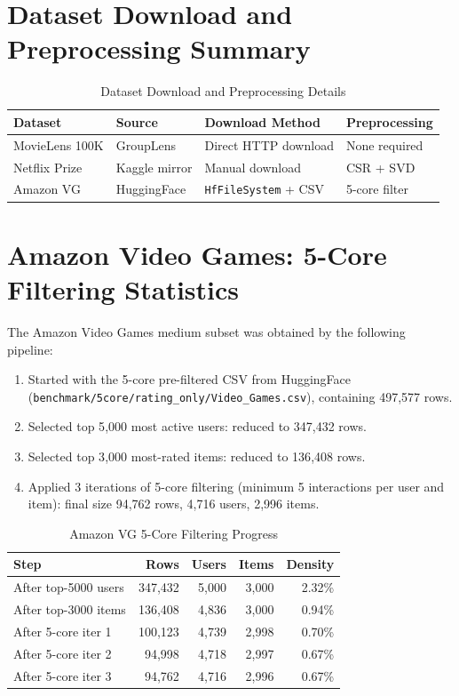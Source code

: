 \section{Dataset Download and Preprocessing Summary}

\begin{table}[htbp]
\centering
\caption{Dataset Download and Preprocessing Details}
\label{tab:download}
\begin{tabular}{llll}
\toprule
\textbf{Dataset} & \textbf{Source} & \textbf{Download Method} & \textbf{Preprocessing} \\
\midrule
MovieLens 100K & GroupLens & Direct HTTP download & None required \\
Netflix Prize  & Kaggle mirror & Manual download & CSR + SVD \\
Amazon VG & HuggingFace & \texttt{HfFileSystem} + CSV & 5-core filter \\
\bottomrule
\end{tabular}
\end{table}

\section{Amazon Video Games: 5-Core Filtering Statistics}

The Amazon Video Games medium subset was obtained by the following pipeline:

\begin{enumerate}
  \item Started with the 5-core pre-filtered CSV from HuggingFace (\texttt{benchmark/5core/rating\_only/Video\_Games.csv}), containing 497{,}577 rows.
  \item Selected top 5{,}000 most active users: reduced to 347{,}432 rows.
  \item Selected top 3{,}000 most-rated items: reduced to 136{,}408 rows.
  \item Applied 3 iterations of 5-core filtering (minimum 5 interactions per user and item): final size 94{,}762 rows, 4{,}716 users, 2{,}996 items.
\end{enumerate}

\begin{table}[htbp]
\centering
\caption{Amazon VG 5-Core Filtering Progress}
\label{tab:amazon_filter}
\begin{tabular}{lrrrr}
\toprule
\textbf{Step} & \textbf{Rows} & \textbf{Users} & \textbf{Items} & \textbf{Density} \\
\midrule
After top-5000 users & 347{,}432 & 5{,}000 & 3{,}000 & 2.32\% \\
After top-3000 items & 136{,}408 & 4{,}836 & 3{,}000 & 0.94\% \\
After 5-core iter 1  & 100{,}123 & 4{,}739 & 2{,}998 & 0.70\% \\
After 5-core iter 2  &  94{,}998 & 4{,}718 & 2{,}997 & 0.67\% \\
After 5-core iter 3  &  94{,}762 & 4{,}716 & 2{,}996 & 0.67\% \\
\bottomrule
\end{tabular}
\end{table}

